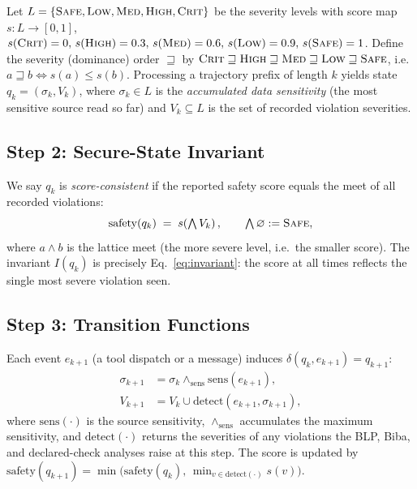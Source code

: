 \documentclass[manuscript,screen,review,anonymous]{acmart}
\begin{document}
Let $L=\{\textsc{Safe},\textsc{Low},\textsc{Med},\textsc{High},\textsc{Crit}\}$ be the severity levels with score map $s:L\to[0,1]$, $s(\textsc{Crit})=0,\,s(\textsc{High})=0.3,\,s(\textsc{Med})=0.6,\,s(\textsc{Low})=0.9,\,s(\textsc{Safe})=1$. Define the severity (dominance) order $\sqsupseteq$ by $\textsc{Crit}\sqsupseteq\textsc{High}\sqsupseteq\textsc{Med}\sqsupseteq\textsc{Low}\sqsupseteq\textsc{Safe}$, i.e.\ $a\sqsupseteq b \iff s(a)\le s(b)$. Processing a trajectory prefix of length $k$ yields state $q_k=(\sigma_k, V_k)$, where $\sigma_k\in L$ is the \emph{accumulated data sensitivity} (the most sensitive source read so far) and $V_k\subseteq L$ is the set of recorded violation severities.

\subsection{Step 2: Secure-State Invariant}

We say $q_k$ is \emph{score-consistent} if the reported safety score equals the meet of all recorded violations:
\begin{equation}
\mathrm{safety}(q_k) \;=\; s\!\left(\textstyle\bigwedge V_k\right), \qquad \textstyle\bigwedge \varnothing := \textsc{Safe},
\label{eq:invariant}
\end{equation}
where $a\wedge b$ is the lattice meet (the more severe level, i.e.\ the smaller score). The invariant $I(q_k)$ is precisely Eq.~\eqref{eq:invariant}: the score at all times reflects the single most severe violation seen.

\subsection{Step 3: Transition Functions}

Each event $e_{k+1}$ (a tool dispatch or a message) induces $\delta(q_k,e_{k+1})=q_{k+1}$:
\begin{align}
\sigma_{k+1} &= \sigma_k \wedge_{\!\text{sens}} \mathrm{sens}(e_{k+1}),\\
V_{k+1} &= V_k \cup \mathrm{detect}(e_{k+1}, \sigma_{k+1}),
\end{align}
where $\mathrm{sens}(\cdot)$ is the source sensitivity, $\wedge_{\text{sens}}$ accumulates the maximum sensitivity, and $\mathrm{detect}(\cdot)$ returns the severities of any violations the BLP, Biba, and declared-check analyses raise at this step. The score is updated by $\mathrm{safety}(q_{k+1})=\min\big(\mathrm{safety}(q_k),\, \min_{v\in \mathrm{detect}(\cdot)} s(v)\big)$.
\end{document}
